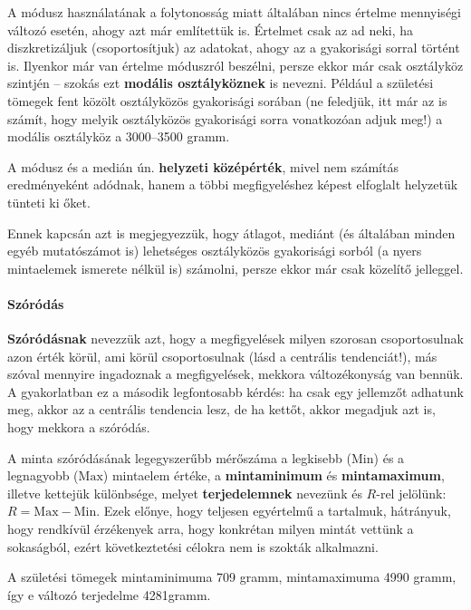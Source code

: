 \documentclass[
]{book}
\begin{document}
A módusz használatának a folytonosság miatt általában nincs értelme mennyiségi változó esetén, ahogy azt már említettük is. Értelmet csak az ad neki, ha diszkretizáljuk (csoportosítjuk) az adatokat, ahogy az a gyakorisági sorral történt is. Ilyenkor már van értelme móduszról beszélni, persze ekkor már csak osztályköz szintjén -- szokás ezt \textbf{modális osztályköznek} is nevezni. Például a születési tömegek fent közölt osztályközös gyakorisági sorában (ne feledjük, itt már az is számít, hogy melyik osztályközös gyakorisági sorra vonatkozóan adjuk meg!) a modális osztályköz a 3000--3500 gramm.

A módusz és a medián ún. \textbf{helyzeti középérték}, mivel nem számítás eredményeként adódnak, hanem a többi megfigyeléshez képest elfoglalt helyzetük tünteti ki őket.

Ennek kapcsán azt is megjegyezzük, hogy átlagot, mediánt (és általában minden egyéb mutatószámot is) lehetséges osztályközös gyakorisági sorból (a nyers mintaelemek ismerete nélkül is) számolni, persze ekkor már csak közelítő jelleggel.

\hypertarget{deskriptivmennyegyvaltanalitikusmutatoszamokszorodas}{%
\paragraph{Szóródás}\label{deskriptivmennyegyvaltanalitikusmutatoszamokszorodas}}

\textbf{Szóródásnak} nevezzük azt, hogy a megfigyelések milyen szorosan csoportosulnak azon érték körül, ami körül csoportosulnak (lásd a centrális tendenciát!), más szóval mennyire ingadoznak a megfigyelések, mekkora változékonyság van bennük. A gyakorlatban ez a második legfontosabb kérdés: ha csak egy jellemzőt adhatunk meg, akkor az a centrális tendencia lesz, de ha kettőt, akkor megadjuk azt is, hogy mekkora a szóródás.

A minta szóródásának legegyszerűbb mérőszáma a legkisebb (\(\mathrm{Min}\)) és a legnagyobb (\(\mathrm{Max}\)) mintaelem értéke, a \textbf{mintaminimum} és \textbf{mintamaximum}, illetve kettejük különbsége, melyet \textbf{terjedelemnek} nevezünk és \(R\)-rel jelölünk: \(R=\mathrm{Max}-\mathrm{Min}\). Ezek előnye, hogy teljesen egyértelmű a tartalmuk, hátrányuk, hogy rendkívül érzékenyek arra, hogy konkrétan milyen mintát vettünk a sokaságból, ezért következtetési célokra nem is szokták alkalmazni.

A születési tömegek mintaminimuma 709 gramm, mintamaximuma 4990 gramm, így e változó terjedelme 4281gramm.
\end{document}
